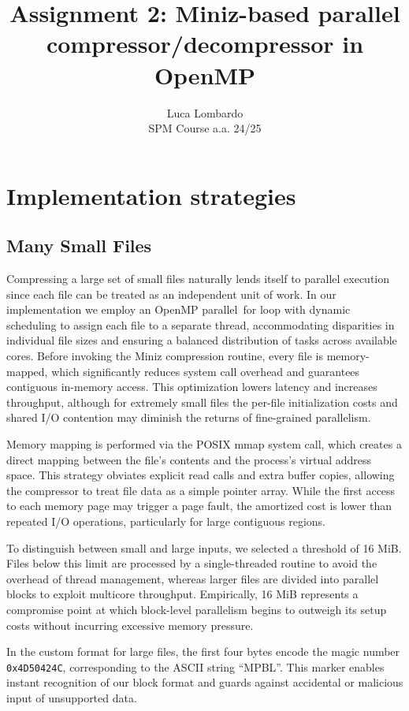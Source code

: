 \documentclass[10pt]{article}
\title{Assignment 2: Miniz-based parallel compressor/decompressor in OpenMP}
\author{Luca Lombardo \\ SPM Course a.a. 24/25}
\date{}
\begin{document}
\maketitle
\vspace{-1.5em}

\section{Implementation strategies}
\subsection{Many Small Files}
Compressing a large set of small files naturally lends itself to parallel execution since each file can be treated as an independent unit of work. In our implementation we employ an OpenMP parallel for loop with dynamic scheduling to assign each file to a separate thread, accommodating disparities in individual file sizes and ensuring a balanced distribution of tasks across available cores. Before invoking the Miniz compression routine, every file is memory-mapped, which significantly reduces system call overhead and guarantees contiguous in-memory access. This optimization lowers latency and increases throughput, although for extremely small files the per-file initialization costs and shared I/O contention may diminish the returns of fine-grained parallelism.

Memory mapping is performed via the \textsf{POSIX} \textsf{mmap} system call, which creates a direct mapping between the file's contents and the process's virtual address space. This strategy obviates explicit read calls and extra buffer copies, allowing the compressor to treat file data as a simple pointer array. While the first access to each memory page may trigger a page fault, the amortized cost is lower than repeated I/O operations, particularly for large contiguous regions.

To distinguish between small and large inputs, we selected a threshold of 16 MiB. Files below this limit are processed by a single-threaded routine to avoid the overhead of thread management, whereas larger files are divided into parallel blocks to exploit multicore throughput. Empirically, 16 MiB represents a compromise point at which block-level parallelism begins to outweigh its setup costs without incurring excessive memory pressure.

In the custom format for large files, the first four bytes encode the magic number \texttt{0x4D50424C}, corresponding to the ASCII string “MPBL”. This marker enables instant recognition of our block format and guards against accidental or malicious input of unsupported data.
\end{document}
